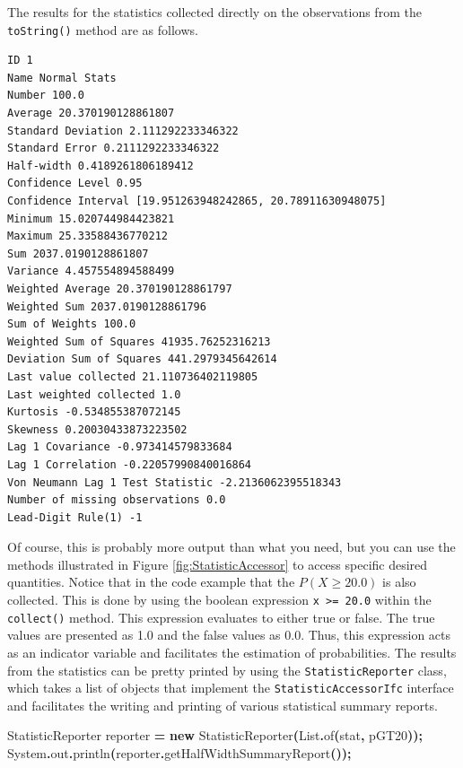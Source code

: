 \documentclass[
]{book}
\newenvironment{Shaded}{\begin{snugshade}}{\end{snugshade}}
\newcommand{\BuiltInTok}[1]{#1}
\newcommand{\FunctionTok}[1]{\textcolor[rgb]{0.00,0.00,0.00}{#1}}
\newcommand{\KeywordTok}[1]{\textcolor[rgb]{0.13,0.29,0.53}{\textbf{#1}}}
\newcommand{\NormalTok}[1]{#1}
\newcommand{\OperatorTok}[1]{\textcolor[rgb]{0.81,0.36,0.00}{\textbf{#1}}}
\theoremstyle{definition}
\theoremstyle{definition}
\theoremstyle{definition}
\theoremstyle{definition}
\theoremstyle{remark}
\begin{document}
The results for the statistics collected directly on the observations from the \texttt{toString()} method are as follows.

\begin{verbatim}
ID 1
Name Normal Stats
Number 100.0
Average 20.370190128861807
Standard Deviation 2.111292233346322
Standard Error 0.2111292233346322
Half-width 0.4189261806189412
Confidence Level 0.95
Confidence Interval [19.951263948242865, 20.78911630948075]
Minimum 15.020744984423821
Maximum 25.33588436770212
Sum 2037.0190128861807
Variance 4.457554894588499
Weighted Average 20.370190128861797
Weighted Sum 2037.0190128861796
Sum of Weights 100.0
Weighted Sum of Squares 41935.76252316213
Deviation Sum of Squares 441.2979345642614
Last value collected 21.110736402119805
Last weighted collected 1.0
Kurtosis -0.534855387072145
Skewness 0.20030433873223502
Lag 1 Covariance -0.973414579833684
Lag 1 Correlation -0.22057990840016864
Von Neumann Lag 1 Test Statistic -2.2136062395518343
Number of missing observations 0.0
Lead-Digit Rule(1) -1
\end{verbatim}

Of course, this is probably more output than what you need, but you can use the methods illustrated in Figure \ref{fig:StatisticAccessor} to access specific desired quantities. Notice that in the code example that the \(P(X \geq 20.0)\) is also collected. This is done by using the boolean expression \texttt{x\ \textgreater{}=\ 20.0} within the \texttt{collect()} method. This expression evaluates to either true or false. The true values are presented as 1.0 and the false values as 0.0. Thus, this expression acts as an indicator variable and facilitates the estimation of probabilities. The results from the statistics can be pretty printed by using the \texttt{StatisticReporter} class, which takes a list of objects that implement the \texttt{StatisticAccessorIfc} interface and facilitates the writing and printing of various statistical summary reports.

\begin{Shaded}
\begin{Highlighting}[]
\NormalTok{StatisticReporter reporter }\OperatorTok{=} \KeywordTok{new} \FunctionTok{StatisticReporter}\OperatorTok{(}\BuiltInTok{List}\OperatorTok{.}\FunctionTok{of}\OperatorTok{(}\NormalTok{stat}\OperatorTok{,}\NormalTok{ pGT20}\OperatorTok{));}
\BuiltInTok{System}\OperatorTok{.}\FunctionTok{out}\OperatorTok{.}\FunctionTok{println}\OperatorTok{(}\NormalTok{reporter}\OperatorTok{.}\FunctionTok{getHalfWidthSummaryReport}\OperatorTok{());}
\end{Highlighting}
\end{Shaded}
\end{document}
